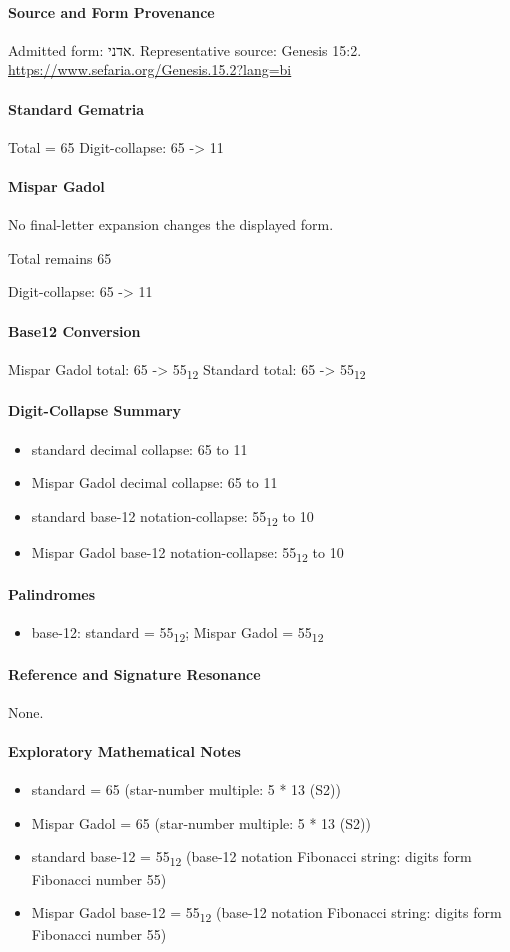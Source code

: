\paragraph{Source and Form Provenance}
Admitted form: אדני.
Representative source: Genesis 15:2.
\url{https://www.sefaria.org/Genesis.15.2?lang=bi}
\paragraph{Standard Gematria}
Total = 65
Digit-collapse: 65 -> 11
\paragraph{Mispar Gadol}
No final-letter expansion changes the displayed form.

Total remains 65

Digit-collapse: 65 -> 11
\paragraph{Base12 Conversion}
Mispar Gadol total: 65 -> 55\textsubscript{12}
Standard total: 65 -> 55\textsubscript{12}
\paragraph{Digit-Collapse Summary}
\begin{itemize}
\item standard decimal collapse: 65 to 11
\item Mispar Gadol decimal collapse: 65 to 11
\item standard base-12 notation-collapse: 55\textsubscript{12} to 10
\item Mispar Gadol base-12 notation-collapse: 55\textsubscript{12} to 10
\end{itemize}
\paragraph{Palindromes}
\begin{itemize}
\item base-12: standard = 55\textsubscript{12}; Mispar Gadol = 55\textsubscript{12}
\end{itemize}
\paragraph{Reference and Signature Resonance}
None.
\paragraph{Exploratory Mathematical Notes}
\begin{itemize}
\item standard = 65 (star-number multiple: 5 * 13 (S2))
\item Mispar Gadol = 65 (star-number multiple: 5 * 13 (S2))
\item standard base-12 = 55\textsubscript{12} (base-12 notation Fibonacci string: digits form Fibonacci number 55)
\item Mispar Gadol base-12 = 55\textsubscript{12} (base-12 notation Fibonacci string: digits form Fibonacci number 55)
\end{itemize}
